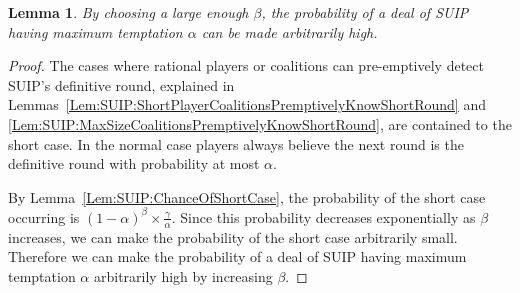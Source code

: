 \documentclass[12pt]{dalcsthesis}
\newtheorem{lemma}{Lemma}
\begin{document}
\begin{lemma}\label{Lem:SUIP:HighTemptationAvoidable}By choosing a large enough $\beta$, the probability of a deal of SUIP having maximum temptation $\alpha$ can be made arbitrarily high.\end{lemma}
\begin{proof}
The cases where rational players or coalitions can pre-emptively detect SUIP's definitive round, explained in Lemmas~\ref{Lem:SUIP:ShortPlayerCoalitionsPremptivelyKnowShortRound} and \ref{Lem:SUIP:MaxSizeCoalitionsPremptivelyKnowShortRound}, are contained to the short case. In the normal case players always believe the next round is the definitive round with probability at most $\alpha$.

By Lemma~\ref{Lem:SUIP:ChanceOfShortCase}, the probability of the short case occurring is $(1-\alpha)^\beta \times \frac{\gamma}{\alpha}$. Since this probability decreases exponentially as $\beta$ increases, we can make the probability of the short case arbitrarily small. Therefore we can make the probability of a deal of SUIP having maximum temptation $\alpha$ arbitrarily high by increasing $\beta$.
\end{proof}
\end{document}
